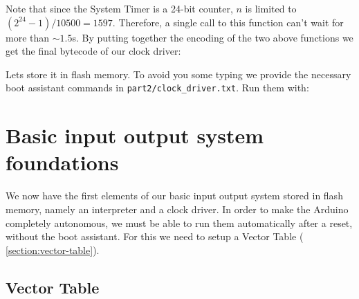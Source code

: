 Note that since the System Timer is a 24-bit counter, $n$ is limited to
$(2^{24}-1)/10500=1597$. Therefore, a single call to this function can't wait
for more than $\sim 1.5$s. By putting together the encoding of the two above
functions we get the final bytecode of our clock driver:



Lets store it in flash memory. To avoid you some typing we provide the
necessary boot assistant commands in \verb!part2/clock_driver.txt!. Run them
with:


\section{Basic input output system foundations}\label{section:bios-foundations}

We now have the first elements of our basic input output system stored in flash
memory, namely an interpreter and a clock driver. In order to make the Arduino
completely autonomous, we must be able to run them automatically after a reset,
without the boot assistant. For this we need to setup a Vector Table (\cf
\cref{section:vector-table}).

\subsection{Vector Table}\label{subsection:bios-vector-table}

